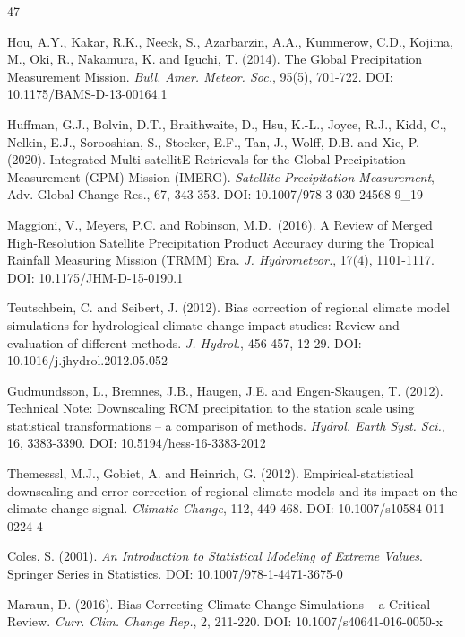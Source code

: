 \documentclass[11pt,a4paper]{article}
\begin{document}
{\footnotesize
\begin{thebibliography}{47}

 Hou, A.Y., Kakar, R.K., Neeck, S., Azarbarzin, A.A., Kummerow,
C.D., Kojima, M., Oki, R., Nakamura, K. and Iguchi, T. (2014). The
Global Precipitation Measurement Mission. \emph{Bull. Amer. Meteor.
Soc.}, 95(5), 701-722. DOI: 10.1175/BAMS-D-13-00164.1

 Huffman, G.J., Bolvin, D.T., Braithwaite, D., Hsu, K.-L., Joyce,
R.J., Kidd, C., Nelkin, E.J., Sorooshian, S., Stocker, E.F., Tan, J.,
Wolff, D.B. and Xie, P. (2020). Integrated Multi-satellitE Retrievals
for the Global Precipitation Measurement (GPM) Mission (IMERG).
\emph{Satellite Precipitation Measurement}, Adv. Global Change Res., 67,
343-353. DOI: 10.1007/978-3-030-24568-9\_19

 Maggioni, V., Meyers, P.C. and Robinson, M.D.~(2016). A Review
of Merged High-Resolution Satellite Precipitation Product Accuracy
during the Tropical Rainfall Measuring Mission (TRMM) Era. \emph{J.
Hydrometeor.}, 17(4), 1101-1117. DOI: 10.1175/JHM-D-15-0190.1

 Teutschbein, C. and Seibert, J. (2012). Bias correction of
regional climate model simulations for hydrological climate-change
impact studies: Review and evaluation of different methods. \emph{J.
Hydrol.}, 456-457, 12-29. DOI: 10.1016/j.jhydrol.2012.05.052

 Gudmundsson, L., Bremnes, J.B., Haugen, J.E. and Engen-Skaugen,
T. (2012). Technical Note: Downscaling RCM precipitation to the station
scale using statistical transformations -- a comparison of methods.
\emph{Hydrol. Earth Syst. Sci.}, 16, 3383-3390. DOI:
10.5194/hess-16-3383-2012

 Themesssl, M.J., Gobiet, A. and Heinrich, G. (2012).
Empirical-statistical downscaling and error correction of regional
climate models and its impact on the climate change signal.
\emph{Climatic Change}, 112, 449-468. DOI: 10.1007/s10584-011-0224-4

 Coles, S. (2001). \emph{An Introduction to Statistical Modeling
of Extreme Values}. Springer Series in Statistics. DOI:
10.1007/978-1-4471-3675-0

 Maraun, D. (2016). Bias Correcting Climate Change Simulations --
a Critical Review. \emph{Curr. Clim. Change Rep.}, 2, 211-220. DOI:
10.1007/s40641-016-0050-x


\end{thebibliography}}
\end{document}
